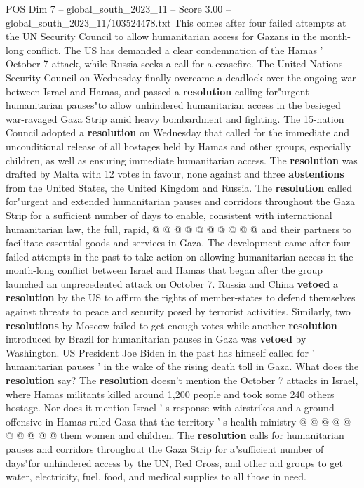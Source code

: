 \begin{textsample}{POS Dim 7 – global\_south\_2023\_11 – Score 3.00 – global\_south\_2023\_11/103524478.txt}  \label{ex:f7_pos_121}
This comes after four failed attempts at the UN Security Council to allow humanitarian access for Gazans in the month-long conflict.
The US has demanded a clear condemnation of the Hamas ' October 7 attack, while Russia seeks a call for a ceasefire.
The United Nations Security Council on Wednesday finally overcame a deadlock over the ongoing war between Israel and Hamas, and passed a \textbf{resolution} calling for"urgent humanitarian pauses"to allow unhindered humanitarian access in the besieged war-ravaged Gaza Strip amid heavy bombardment and fighting.
The 15-nation Council adopted a \textbf{resolution} on Wednesday that called for the immediate and unconditional release of all hostages held by Hamas and other groups, especially children, as well as ensuring immediate humanitarian access.
The \textbf{resolution} was drafted by Malta with 12 votes in favour, none against and three \textbf{abstentions} from the United States, the United Kingdom and Russia.
The \textbf{resolution} called for"urgent and extended humanitarian pauses and corridors throughout the Gaza Strip for a sufficient number of days to enable, consistent with international humanitarian law, the full, rapid, @ @ @ @ @ @ @ @ @ @ and their partners to facilitate essential goods and services in Gaza.
The development came after four failed attempts in the past to take action on allowing humanitarian access in the month-long conflict between Israel and Hamas that began after the group launched an unprecedented attack on October 7.
Russia and China \textbf{vetoed} a \textbf{resolution} by the US to affirm the rights of member-states to defend themselves against threats to peace and security posed by terrorist activities.
Similarly, two \textbf{resolutions} by Moscow failed to get enough votes while another \textbf{resolution} introduced by Brazil for humanitarian pauses in Gaza was \textbf{vetoed} by Washington.
US President Joe Biden in the past has himself called for ' humanitarian pauses ' in the wake of the rising death toll in Gaza.
What does the \textbf{resolution} say?
The \textbf{resolution} doesn't mention the October 7 attacks in Israel, where Hamas militants killed around 1,200 people and took some 240 others hostage.
Nor does it mention Israel ' s response with airstrikes and a ground offensive in Hamas-ruled Gaza that the territory ' s health ministry @ @ @ @ @ @ @ @ @ @ them women and children.
The \textbf{resolution} calls for humanitarian pauses and corridors throughout the Gaza Strip for a"sufficient number of days"for unhindered access by the UN, Red Cross, and other aid groups to get water, electricity, fuel, food, and medical supplies to all those in need.

\end{textsample}
